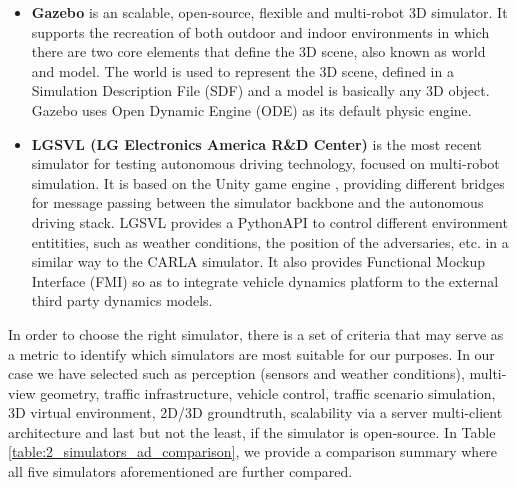 \begin{itemize}
	\item \textbf{Gazebo} \cite{koenig2004design} is an scalable, open-source, flexible and multi-robot 3D simulator. It supports the recreation of both outdoor and indoor environments in which there are two core elements that define the 3D scene, also known as world and model. The world is used to represent the 3D scene, defined in a Simulation Description File (SDF) and a model is basically any 3D object. Gazebo uses Open Dynamic Engine (ODE) as its default physic engine.
	
	\item \textbf{LGSVL (LG Electronics America R\&D Center)} \cite{rong2020lgsvl} is the most recent simulator for testing autonomous driving technology, focused on multi-robot simulation. It is based on the Unity game engine \cite{haas2014history}, providing different bridges for message passing between the simulator backbone and the autonomous driving stack. LGSVL provides a PythonAPI to control different environment entitities, such as weather conditions, the position of the adversaries, etc. in a similar way to the CARLA simulator. It also provides Functional Mockup Interface (FMI) so as to integrate vehicle dynamics platform to the external third party dynamics models.
	
\end{itemize}

In order to choose the right simulator, there is a set of criteria \cite{kaur2021survey} that may serve as a metric to identify which simulators are most suitable for our purposes. In our case we have selected such as perception (sensors and weather conditions), multi-view geometry, traffic infrastructure, vehicle control, traffic scenario simulation, 3D virtual environment, 2D/3D groundtruth, scalability via a server multi-client architecture and last but not the least, if the simulator is open-source. In Table \ref{table:2_simulators_ad_comparison}, we provide a comparison summary where all five simulators aforementioned are further compared.

